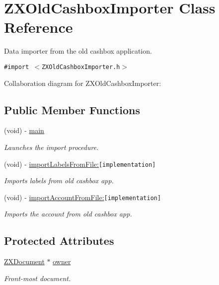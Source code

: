 \hypertarget{interface_z_x_old_cashbox_importer}{
\section{ZXOldCashboxImporter Class Reference}
\label{interface_z_x_old_cashbox_importer}
}
Data importer from the old cashbox application.  


{\tt \#import $<$ZXOldCashboxImporter.h$>$}

Collaboration diagram for ZXOldCashboxImporter:\subsection*{Public Member Functions}
\begin{CompactItemize}
\item 
\hypertarget{interface_z_x_old_cashbox_importer_c2405c654a0f53cf58b5edc8eedd5053}{
(void) - \hyperlink{interface_z_x_old_cashbox_importer_c2405c654a0f53cf58b5edc8eedd5053}{main}}
\label{interface_z_x_old_cashbox_importer_c2405c654a0f53cf58b5edc8eedd5053}

\begin{CompactList}\small\item\em Launches the import procedure. \item\end{CompactList}\item 
(void) - \hyperlink{interface_z_x_old_cashbox_importer_a0ff323ece14ee720fa1f60148ce419f}{importLabelsFromFile:}{\tt  \mbox{[}implementation\mbox{]}}
\begin{CompactList}\small\item\em Imports labels from old cashbox app. \item\end{CompactList}\item 
(void) - \hyperlink{interface_z_x_old_cashbox_importer_58a7e29a3daf68ba41686fef6f46bdc4}{importAccountFromFile:}{\tt  \mbox{[}implementation\mbox{]}}
\begin{CompactList}\small\item\em Imports the account from old cashbox app. \item\end{CompactList}\end{CompactItemize}
\subsection*{Protected Attributes}
\begin{CompactItemize}
\item 
\hypertarget{interface_z_x_old_cashbox_importer_fbd5a431127388945eadec4b602ad5c5}{
\hyperlink{interface_z_x_document}{ZXDocument} $\ast$ \hyperlink{interface_z_x_old_cashbox_importer_fbd5a431127388945eadec4b602ad5c5}{owner}}
\label{interface_z_x_old_cashbox_importer_fbd5a431127388945eadec4b602ad5c5}

\begin{CompactList}\small\item\em Front-most document. \item\end{CompactList}\end{CompactItemize}
